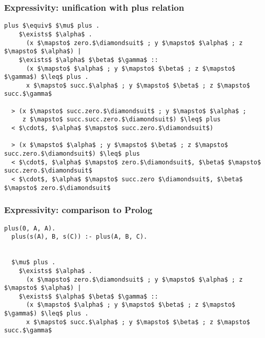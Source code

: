 \documentclass{beamer}
\begin{document}
\begin{frame}[fragile]
  \frametitle{Expressivity: unification with plus relation}

  \begin{lstlisting}[]
  plus $\equiv$ $\mu$ plus .
    $\exists$ $\alpha$ . 
      (x $\mapsto$ zero.$\diamondsuit$ ; y $\mapsto$ $\alpha$ ; z $\mapsto$ $\alpha$) |
    $\exists$ $\alpha$ $\beta$ $\gamma$ :: 
      (x $\mapsto$ $\alpha$ ; y $\mapsto$ $\beta$ ; z $\mapsto$ $\gamma$) $\leq$ plus . 
      x $\mapsto$ succ.$\alpha$ ; y $\mapsto$ $\beta$ ; z $\mapsto$ succ.$\gamma$

  > (x $\mapsto$ succ.zero.$\diamondsuit$ ; y $\mapsto$ $\alpha$ ; 
     z $\mapsto$ succ.succ.zero.$\diamondsuit$) $\leq$ plus
  < $\cdot$, $\alpha$ $\mapsto$ succ.zero.$\diamondsuit$)

  > (x $\mapsto$ $\alpha$ ; y $\mapsto$ $\beta$ ; z $\mapsto$ succ.zero.$\diamondsuit$) $\leq$ plus
  < $\cdot$, $\alpha$ $\mapsto$ zero.$\diamondsuit$, $\beta$ $\mapsto$ succ.zero.$\diamondsuit$
  < $\cdot$, $\alpha$ $\mapsto$ succ.zero $\diamondsuit$, $\beta$ $\mapsto$ zero.$\diamondsuit$
  \end{lstlisting}


\end{frame}
\begin{frame}[fragile]
  \frametitle{Expressivity: comparison to Prolog}

  \begin{lstlisting}[]
  plus(0, A, A).
  plus(s(A), B, s(C)) :- plus(A, B, C).


  $\mu$ plus .
    $\exists$ $\alpha$ . 
      (x $\mapsto$ zero.$\diamondsuit$ ; y $\mapsto$ $\alpha$ ; z $\mapsto$ $\alpha$) |
    $\exists$ $\alpha$ $\beta$ $\gamma$ :: 
      (x $\mapsto$ $\alpha$ ; y $\mapsto$ $\beta$ ; z $\mapsto$ $\gamma$) $\leq$ plus . 
      x $\mapsto$ succ.$\alpha$ ; y $\mapsto$ $\beta$ ; z $\mapsto$ succ.$\gamma$

  \end{lstlisting}

\end{frame}
\end{document}
